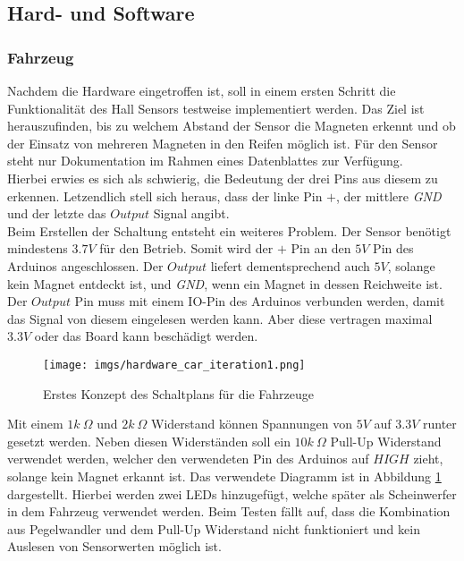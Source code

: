 \documentclass[.../Dokumentation.tex]{subfiles}
\begin{document}
\subsection{Hard- und Software}
\label{sec-ita1-hardware}

\subsubsection*{Fahrzeug}
Nachdem die Hardware eingetroffen ist, soll in einem ersten Schritt 
die Funktionalität des Hall Sensors testweise implementiert werden. Das Ziel 
ist herauszufinden, bis zu welchem Abstand der Sensor die Magneten erkennt und 
ob der Einsatz von mehreren Magneten in den Reifen möglich ist. Für den Sensor 
steht nur Dokumentation im Rahmen eines Datenblattes zur Verfügung.\\
Hierbei erwies es sich als schwierig, die Bedeutung der drei Pins aus diesem zu 
erkennen. Letzendlich stell sich heraus, dass der linke Pin $+$, der 
mittlere \textit{GND} und der letzte das $Output$ Signal angibt.\\
Beim Erstellen der Schaltung entsteht ein weiteres Problem. Der Sensor benötigt 
mindestens $3.7V$ für den Betrieb. Somit wird der $+$ Pin an den $5V$ Pin des 
Arduinos angeschlossen. Der $Output$ liefert dementsprechend auch $5V$, solange 
kein Magnet entdeckt ist, und \textit{GND}, wenn ein Magnet in dessen Reichweite ist. 
Der $Output$ Pin muss mit einem IO-Pin des Arduinos verbunden werden, damit das 
Signal von diesem eingelesen werden kann. Aber diese vertragen  maximal $3.3V$ 
oder das Board kann beschädigt werden.
\begin{figure}[H]
\begin{center}
    \texttt{[image: imgs/hardware\_car\_iteration1.png]}
    \caption{Erstes Konzept des Schaltplans für die Fahrzeuge}
    \label{fig-hardware-car-iteration1}
\end{center}
\end{figure}
\noindent
Mit einem $1k\ \Omega$ und $2k\ \Omega$ Widerstand können Spannungen von $5V$ 
auf $3.3V$ runter gesetzt werden. Neben diesen Widerständen soll ein 
$10k\ \Omega$ Pull-Up Widerstand verwendet werden, welcher den verwendeten Pin 
des Arduinos auf $HIGH$ zieht, solange kein Magnet erkannt ist. Das verwendete 
Diagramm ist in Abbildung \ref{fig-hardware-car-iteration1} dargestellt. 
Hierbei werden zwei LEDs hinzugefügt, welche später als Scheinwerfer in 
dem Fahrzeug verwendet werden. Beim Testen fällt auf, dass die Kombination aus 
Pegelwandler und dem Pull-Up Widerstand nicht funktioniert und kein Auslesen 
von Sensorwerten möglich ist.
\end{document}
